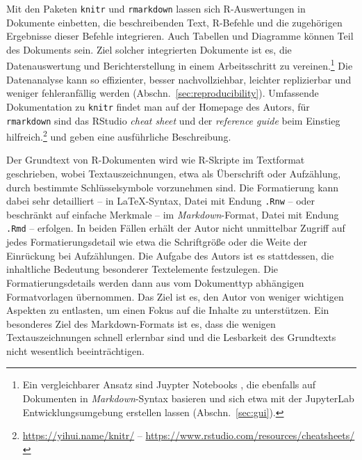 Mit den Paketen \lstinline!knitr! \cite{Xie2012} und \lstinline!rmarkdown! \cite{RStudio2014a} lassen sich R-Auswertungen in Dokumente einbetten, die beschreibenden Text, R-Befehle und die zugehörigen Ergebnisse dieser Befehle integrieren. Auch Tabellen und Diagramme können Teil des Dokuments sein. Ziel solcher integrierten Dokumente ist es, die Datenauswertung und Berichterstellung in einem Arbeitsschritt zu vereinen.\footnote{Ein vergleichbarer Ansatz sind Juypter Notebooks \cite{Kluyver2016}, die ebenfalls auf Dokumenten in \emph{Markdown}-Syntax basieren und sich etwa mit der JupyterLab Entwicklungsumgebung erstellen lassen (Abschn.\ \ref{sec:gui}).} Die Datenanalyse kann so effizienter, besser nachvollziehbar, leichter replizierbar und weniger fehleranfällig werden (Abschn.\ \ref{sec:reproducibility}). Umfassende Dokumentation zu \lstinline!knitr! findet man auf der Homepage des Autors, für \lstinline!rmarkdown! sind das RStudio \emph{cheat sheet} und der \emph{reference guide} beim Einstieg hilfreich.\footnote{\url{https://yihui.name/knitr/} -- \url{https://www.rstudio.com/resources/cheatsheets/}}  und  geben eine ausführliche Beschreibung.

Der Grundtext von R-Dokumenten wird wie R-Skripte im Textformat geschrieben, wobei Textauszeichnungen, etwa als Überschrift oder Aufzählung, durch bestimmte Schlüsselsymbole vorzunehmen sind. Die Formatierung kann dabei sehr detailliert -- in \LaTeX-Syntax, Datei mit Endung \lstinline!.Rnw! -- oder beschränkt auf einfache Merkmale -- im \emph{Markdown}-Format, Datei mit Endung \lstinline!.Rmd! -- erfolgen. In beiden Fällen erhält der Autor nicht unmittelbar Zugriff auf jedes Formatierungsdetail wie etwa die Schriftgröße oder die Weite der Einrückung bei Aufzählungen. Die Aufgabe des Autors ist es stattdessen, die inhaltliche Bedeutung besonderer Textelemente festzulegen. Die Formatierungsdetails werden dann aus vom Dokumenttyp abhängigen Formatvorlagen übernommen. Das Ziel ist es, den Autor von weniger wichtigen Aspekten zu entlasten, um einen Fokus auf die Inhalte zu unterstützen. Ein besonderes Ziel des Markdown-Formats ist es, dass die wenigen Textauszeichnungen schnell erlernbar sind und die Lesbarkeit des Grundtexts nicht wesentlich beeinträchtigen.

